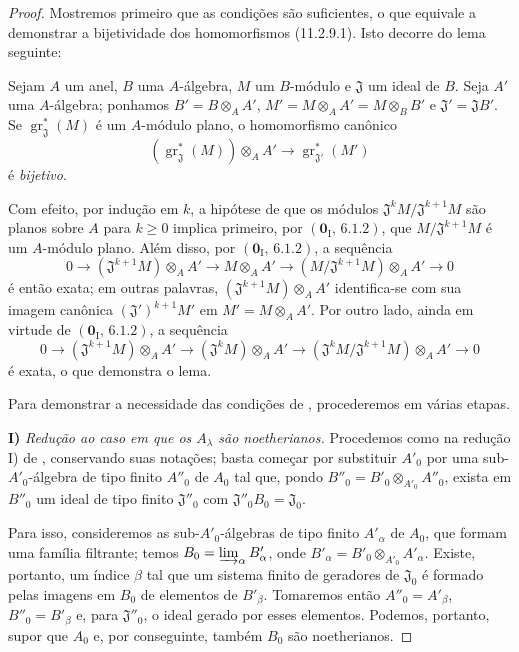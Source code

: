 \begin{proof}
Mostremos primeiro que as condições são suficientes, o que equivale a demonstrar a bijetividade dos homomorfismos (11.2.9.1). Isto decorre do lema seguinte:


\begin{lemma}[11.2.9.2]
\label{IV.11.2.9.2}
Sejam $A$ um anel, $B$ uma $A$-álgebra, $M$ um $B$-módulo e $\mathfrak J$ um ideal de $B$. Seja $A'$ uma $A$-álgebra; ponhamos $B'=B\otimes_AA'$, $M'=M\otimes_AA'=M\otimes_BB'$ e $\mathfrak J'=\mathfrak JB'$. Se $\operatorname{gr}_{\mathfrak J}^*(M)$ é um $A$-módulo plano, o homomorfismo canônico
\[
(\operatorname{gr}_{\mathfrak J}^*(M))\otimes_AA'
\longrightarrow\operatorname{gr}_{\mathfrak J'}^*(M')
\]
é \emph{bijetivo}.
\end{lemma}

Com efeito, por indução em $k$, a hipótese de que os módulos $\mathfrak J^kM/\mathfrak J^{k+1}M$ são planos sobre $A$ para $k\geq0$ implica primeiro, por $(\mathbf 0_{\mathrm I},\,6.1.2)$, que $M/\mathfrak J^{k+1}M$ é um $A$-módulo plano. Além disso, por $(\mathbf 0_{\mathrm I},\,6.1.2)$, a sequência
\[
0\longrightarrow(\mathfrak J^{k+1}M)\otimes_AA'
\longrightarrow M\otimes_AA'
\longrightarrow(M/\mathfrak J^{k+1}M)\otimes_AA'
\longrightarrow0
\]
é então exata; em outras palavras, $(\mathfrak J^{k+1}M)\otimes_AA'$ identifica-se com sua imagem canônica $(\mathfrak J')^{k+1}M'$ em $M'=M\otimes_AA'$. Por outro lado, ainda em virtude de $(\mathbf 0_{\mathrm I},\,6.1.2)$, a sequência
\[
0\longrightarrow(\mathfrak J^{k+1}M)\otimes_AA'
\longrightarrow(\mathfrak J^kM)\otimes_AA'
\longrightarrow(\mathfrak J^kM/\mathfrak J^{k+1}M)\otimes_AA'
\longrightarrow0
\]
é exata, o que demonstra o lema.

Para demonstrar a necessidade das condições de , procederemos em várias etapas.

\medskip
\noindent\textbf{I)} \emph{Redução ao caso em que os $A_\lambda$ são noetherianos.} Procedemos como na redução I) de , conservando suas notações; basta começar por substituir $A'_0$ por uma sub-$A'_0$-álgebra de tipo finito $A''_0$ de $A_0$ tal que, pondo $B''_0=B'_0\otimes_{A'_0}A''_0$, exista em $B''_0$ um ideal de tipo finito $\mathfrak J''_0$ com $\mathfrak J''_0B_0=\mathfrak J_0$.

Para isso, consideremos as sub-$A'_0$-álgebras de tipo finito $A'_\alpha$ de $A_0$, que formam uma família filtrante; temos $B_0=\varinjlim_\alpha B'_\alpha$, onde $B'_\alpha=B'_0\otimes_{A'_0}A'_\alpha$. Existe, portanto, um índice $\beta$ tal que um sistema finito de geradores de $\mathfrak J_0$ é formado pelas imagens em $B_0$ de elementos de $B'_\beta$. Tomaremos então $A''_0=A'_\beta$, $B''_0=B'_\beta$ e, para $\mathfrak J''_0$, o ideal gerado por esses elementos. Podemos, portanto, supor que $A_0$ e, por conseguinte, também $B_0$ são noetherianos.


\end{proof}
